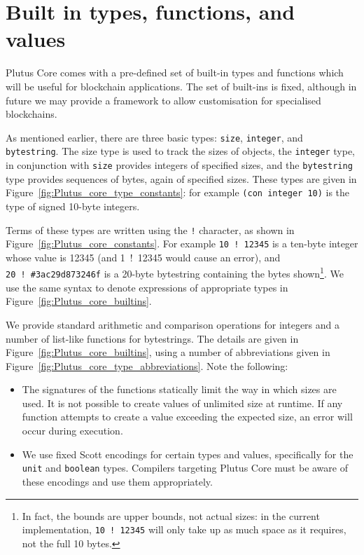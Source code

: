 \documentclass[a4paper]{article}
\begin{document}
\section{Built in types, functions, and values}
\label{sec:builtins}
Plutus Core comes with a pre-defined set of built-in types and
functions which will be useful for blockchain applications.  The set
of built-ins is fixed, although in future we may provide a framework
to allow customisation for specialised blockchains.

As mentioned earlier, there are three basic types: \texttt{size},
\texttt{integer}, and \texttt{bytestring}.  The \textrm{size} type is
used to track the sizes of objects, the \texttt{integer} type, in
conjunction with \texttt{size} provides integers of specified sizes,
and the \texttt{bytestring} type provides sequences of bytes, again of
specified sizes.  These types are given in
Figure~\ref{fig:Plutus_core_type_constants}:  for example 
\texttt{(con integer 10)} is the type of signed 10-byte integers.


Terms of these types are written using the \texttt{!} character, as
shown in Figure~\ref{fig:Plutus_core_constants}.  For example
\texttt{10~!~12345} is a ten-byte integer whose value is 12345 (and
\textrm{1~!~12345} would cause an error), and \texttt{20~!~\#3ac29d873246f} 
is a 20-byte bytestring containing the bytes
shown\footnote{In fact, the bounds are upper bounds, not actual sizes:
  in the current implementation, \texttt{10~!~12345} will only take up
  as much space as it requires, not the full 10 bytes.}.  We use the
same syntax to denote expressions of appropriate types in
Figure~\ref{fig:Plutus_core_builtins}.

We provide standard arithmetic and comparison operations for integers
and a number of list-like functions for bytestrings. The details are
given in Figure~\ref{fig:Plutus_core_builtins}, using a number of
abbreviations given in Figure~\ref{fig:Plutus_core_type_abbreviations}.
Note the following:
\begin{itemize}
\item The signatures of the functions statically limit the way in
  which sizes are used.  It is not possible to create values of
  unlimited size at runtime.  If any function attempts to create a
  value exceeding the expected size, an error will occur during execution.
\item We use fixed Scott encodings for certain types and values,
  specifically for the \texttt{unit} and \texttt{boolean} types.
Compilers targeting Plutus Core must be aware of these encodings and
use them appropriately.
\end{itemize}
\end{document}
